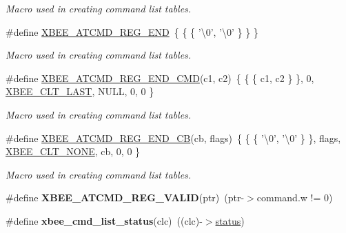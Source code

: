 \begin{DoxyCompactItemize}
\begin{DoxyCompactList}\small\item\em Macro used in creating command list tables. \end{DoxyCompactList}\item 
\#define \hyperlink{group__xbee__atcmd_ga22fe547f7ae9fd0b090c5e45f03c162d}{X\-B\-E\-E\-\_\-\-A\-T\-C\-M\-D\-\_\-\-R\-E\-G\-\_\-\-E\-N\-D}~\{ \{ \{ '\textbackslash{}0', '\textbackslash{}0' \} \} \}
\begin{DoxyCompactList}\small\item\em Macro used in creating command list tables. \end{DoxyCompactList}\item 
\#define \hyperlink{group__xbee__atcmd_gaaed20e2dcb547e8a3256e1168e1c95b0}{X\-B\-E\-E\-\_\-\-A\-T\-C\-M\-D\-\_\-\-R\-E\-G\-\_\-\-E\-N\-D\-\_\-\-C\-M\-D}(c1, c2)~\{ \{ \{ c1, c2 \} \}, 0, \hyperlink{group__xbee__atcmd_gga1bd8ecd38c107579d20ded3c79a7d70ba6e78c45780bccbc7226af34868dc567f}{X\-B\-E\-E\-\_\-\-C\-L\-T\-\_\-\-L\-A\-S\-T}, N\-U\-L\-L, 0, 0 \}
\begin{DoxyCompactList}\small\item\em Macro used in creating command list tables. \end{DoxyCompactList}\item 
\#define \hyperlink{group__xbee__atcmd_gae8d6778e286e3bf82eafc842d451c161}{X\-B\-E\-E\-\_\-\-A\-T\-C\-M\-D\-\_\-\-R\-E\-G\-\_\-\-E\-N\-D\-\_\-\-C\-B}(cb, flags)~\{ \{ \{ '\textbackslash{}0', '\textbackslash{}0' \} \}, flags, \hyperlink{group__xbee__atcmd_gga1bd8ecd38c107579d20ded3c79a7d70ba01bd43706bd844415cc0882b861df4d1}{X\-B\-E\-E\-\_\-\-C\-L\-T\-\_\-\-N\-O\-N\-E}, cb, 0, 0 \}
\begin{DoxyCompactList}\small\item\em Macro used in creating command list tables. \end{DoxyCompactList}\item 
\hypertarget{group__xbee__atcmd_ga1c37bac63df4c1378f8140c6e02eb301}{\#define {\bfseries X\-B\-E\-E\-\_\-\-A\-T\-C\-M\-D\-\_\-\-R\-E\-G\-\_\-\-V\-A\-L\-I\-D}(ptr)~(ptr-\/$>$command.\-w != 0)}\label{group__xbee__atcmd_ga1c37bac63df4c1378f8140c6e02eb301}

\item 
\hypertarget{group__xbee__atcmd_ga75cfdd39f5f70bd8a180f9c858927aec}{\#define {\bfseries xbee\-\_\-cmd\-\_\-list\-\_\-status}(clc)~((clc)-\/$>$\hyperlink{group__xbee__atcmd_gade818037fd6c985038ff29656089758d}{status})}\label{group__xbee__atcmd_ga75cfdd39f5f70bd8a180f9c858927aec}


\end{DoxyCompactItemize}
